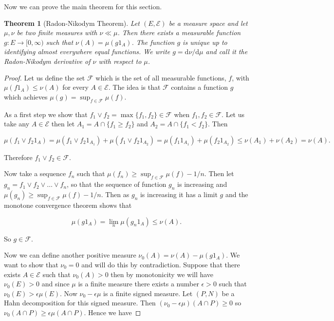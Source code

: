 \documentclass[
]{book}
\newtheorem{theorem}{Theorem}[chapter]
\theoremstyle{definition}
\theoremstyle{definition}
\theoremstyle{definition}
\theoremstyle{definition}
\theoremstyle{remark}
\begin{document}
Now we can prove the main theorem for this section.

\begin{theorem}[Radon-Nikodym Theorem]
Let \((E, \mathcal{E})\) be a measure space and let \(\mu, \nu\) be two finite measures with \(\nu \ll \mu\). Then there exists a measurable function \(g: E \rightarrow [0, \infty)\) such that \(\nu(A) = \mu(g1_A)\). The function \(g\) is unique up to identifying almost everywhere equal functions. We write \(g = \mathrm{d}\nu/\mathrm{d}\mu\) and call it the Radon-Nikodym derivative of \(\nu\) with respect to \(\mu\).
\end{theorem}

\begin{proof}
Let us define the set \(\mathcal{F}\) which is the set of all measurable functions, \(f\), with \(\mu(f1_A) \leq \nu(A)\) for every \(A \in \mathcal{E}\). The idea is that \(\mathcal{F}\) contains a function \(g\) which achieves \(\mu(g) = \sup_{f \in \mathcal{F}} \mu(f)\).

As a first step we show that \(f_1 \vee f_2 = \max\{ f_1, f_2\} \in \mathcal{F}\) when \(f_1, f_2 \in \mathcal{F}\). Let us take any \(A \in \mathcal{E}\) then let \(A_1 = A \cap \{ f_1 \geq f_2\}\) and \(A_2 = A \cap \{ f_1 < f_2\}\). Then

\[ \mu(f_1 \vee f_2 1_A) = \mu(f_1 \vee f_2 1_{A_1}) + \mu(f_1 \vee f_2 1_{A_2}) = \mu(f_1 1_{A_1}) + \mu(f_2 1_{A_2}) \leq \nu(A_1) + \nu(A_2) = \nu(A).  \]

Therefore \(f_1 \vee f_2 \in \mathcal{F}\).

Now take a sequence \(f_n\) such that \(\mu(f_n) \geq \sup_{f \in \mathcal{F}} \mu(f) - 1/n\). Then let \(g_n = f_1 \vee f_2 \vee \dots \vee f_n\), so that the sequence of function \(g_n\) is increasing and \(\mu(g_n) \geq \sup_{f \in \mathcal{F}} \mu(f) - 1/n\). Then as \(g_n\) is increasing it has a limit \(g\) and the monotone convergence theorem shows that

\[ \mu(g1_A) = \lim_n \mu(g_n1_A) \leq \nu(A). \]

So \(g \in \mathcal{F}\).

Now we can define another positive measure \(\nu_0(A) = \nu(A) - \mu(g1_A)\). We want to show that \(\nu_0 =0\) and will do this by contradiction. Suppose that there exists \(A \in \mathcal{E}\) such that \(\nu_0(A)>0\) then by monotonicity we will have \(\nu_0(E) >0\) and since \(\mu\) is a finite measure there exists a number \(\epsilon >0\) such that \(\nu_0(E) > \epsilon \mu(E)\). Now \(\nu_0 - \epsilon \mu\) is a finite signed measure. Let \((P, N)\) be a Hahn decomposition for this signed measure. Then \((\nu_0 - \epsilon \mu)(A \cap P) \geq 0\) so \(\nu_0(A\cap P) \geq \epsilon \mu(A \cap P)\). Hence we have


\end{proof}
\end{document}
